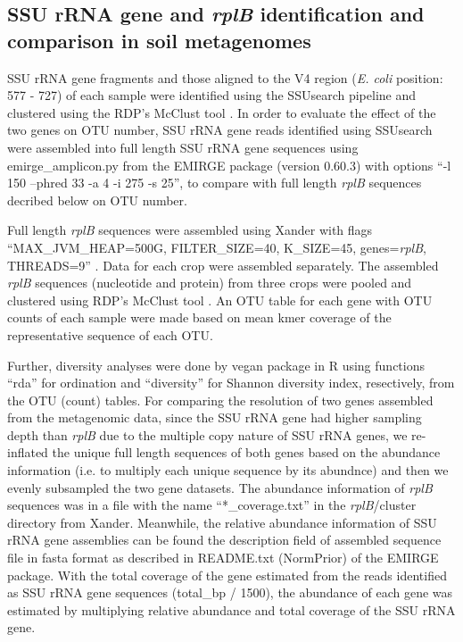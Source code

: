 \documentclass[]{msu-thesis}
\begin{document}
\subsection{SSU rRNA gene and \textit{rplB} identification and comparison in soil metagenomes}
SSU rRNA gene fragments and those aligned to the V4 region (\textit{E. coli} position: 577 - 727) of each sample were identified using the SSUsearch pipeline \cite{guo_microbial_2015} and clustered using the RDP's McClust tool \cite{cole_ribosomal_2014}. In order to evaluate the effect of the two genes on OTU number, SSU rRNA gene reads identified using SSUsearch were assembled into full length SSU rRNA gene sequences using emirge\_amplicon.py from the EMIRGE package (version 0.60.3) \cite{miller_short-read_2013} with options ``-l 150 --phred 33 -a 4 -i 275 -s 25'', to compare with full length \textit{rplB} sequences decribed below on OTU number.

\begin{sloppypar}
Full length \textit{rplB} sequences were assembled using Xander with flags ``MAX\_JVM\_HEAP=500G, FILTER\_SIZE=40, K\_SIZE=45, genes=\textit{rplB}, THREADS=9'' \cite{wang_xander:_2015}. Data for each crop were assembled separately. The assembled \textit{rplB} sequences (nucleotide and protein) from three crops were pooled and clustered using RDP’s McClust tool \cite{cole_ribosomal_2014}. An OTU table for each gene with OTU counts of each sample were made based on mean kmer coverage of the representative sequence of each OTU. 
\end{sloppypar}

Further, diversity analyses were done by vegan package in R using functions ``rda'' for ordination and ``diversity'' for Shannon diversity index, resectively, from the OTU (count) tables. For comparing the resolution of two genes assembled from the metagenomic data, since the SSU rRNA gene had higher sampling depth than \textit{rplB} due to the multiple copy nature of SSU rRNA genes, we re-inflated the unique full length sequences of both genes based on the abundance information (i.e. to multiply each unique sequence by its abundnce) and then we evenly subsampled the two gene datasets. The abundance information of \textit{rplB} sequences was in a file with the name ``*\_coverage.txt'' in the \textit{rplB}/cluster directory from Xander. Meanwhile, the relative abundance information of SSU rRNA gene assemblies can be found the description field of assembled sequence file in fasta format as described in README.txt (NormPrior) of the EMIRGE package. With the total coverage of the gene estimated from the reads identified as  SSU rRNA gene sequences (total\_bp / 1500), the abundance of each gene was estimated by multiplying relative abundance and total coverage of the SSU rRNA gene.
\end{document}

